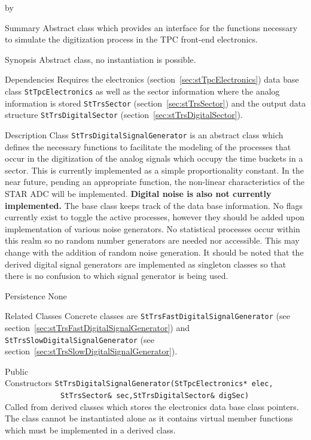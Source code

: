 \documentclass[twoside]{article}
\newcommand{\comp}[1]{\texttt{#1}}%
\newcommand{\entrylabel}[1]{\mbox{\textbf{{#1}}}\hfil}%
\newenvironment{entry}
{\begin{list}{}%
    {\renewcommand{\makelabel}{\entrylabel}%
     \setlength{\labelwidth}{90pt}%
     \setlength{\leftmargin}{\labelwidth}
     \advance\leftmargin by \labelsep%
      }%
    }%
  {\end{list}}
\newcommand{\Entrylabel}[1]%
{\raisebox{0pt}[1ex][0pt]{\makebox[\labelwidth][l]%
    {\parbox[t]{\labelwidth}{\hspace{0pt}\textbf{{#1}}}}}}
\newenvironment{Entry}%
{\renewcommand{\entrylabel}{\Entrylabel}\begin{entry}}%
  {\end{entry}}
\begin{document}
\begin{Entry}
\item[Summary]
  Abstract class which provides an interface for the functions necessary 
  to simulate the digitization process in the TPC front-end electronics.

\item[Synopsis]
   Abstract class, no instantiation is possible.

\item[Dependencies]
   Requires the electronics (section~\ref{sec:stTpcElectronics}) 
   data base class \comp{StTpcElectronics} as well as the sector
   information where the analog
   information is stored \comp{StTrsSector}
   (section~\ref{sec:stTrsSector}) and the output data structure
   \comp{StTrsDigitalSector} (section~\ref{sec:stTrsDigitalSector}).

\item[Description]
Class \comp{StTrsDigitalSignalGenerator} is an abstract class which defines
the necessary functions to facilitate the modeling of the 
processes that occur in the digitization of the analog signals
which occupy the time buckets in a sector.  This is currently
implemented as a simple proportionality constant.  In the near
future, pending an appropriate function, the non-linear characteristics
of the STAR ADC will be implemented.  {\bf Digital noise is also not
  currently implemented.}
The base class keeps track of the data base information.
No flags currently exist to
toggle the active processes, however they should be added upon implementation
of various noise generators.  No statistical processes occur
within this realm so no random number generators are needed nor accessible.
This may change with the addition of random noise generation.
It should be noted that the derived digital signal generators are implemented
as singleton classes so that there is no confusion to which signal
generator is being used. 

\item[Persistence]
   None

\item[Related Classes]
   Concrete  classes are \comp{StTrsFastDigitalSignalGenerator} (see 
   section~\ref{sec:stTrsFastDigitalSignalGenerator}) and
   \comp{StTrsSlowDigitalSignalGenerator} (see 
   section~\ref{sec:stTrsSlowDigitalSignalGenerator}).  

\item[Public \\ Constructors]
   \verb+StTrsDigitalSignalGenerator(StTpcElectronics* elec,+\\
   \verb+             StTrsSector& sec,StTrsDigitalSector& digSec)+\\
   Called from derived classes which stores the electronics data base 
   class pointers.
   The class cannot be instantiated alone as it contains virtual 
   member functions which must be implemented
   in a derived class.


\end{Entry}
\end{document}
